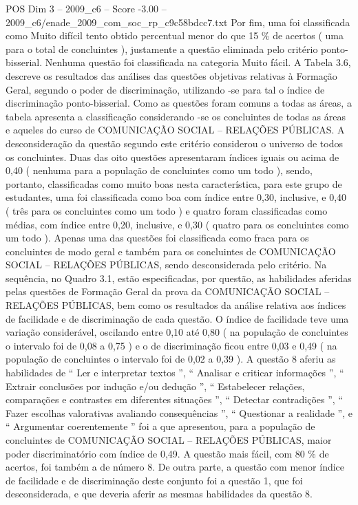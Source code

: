 \begin{textsample}{POS Dim 3 – 2009\_c6 – Score -3.00 – 2009\_c6/enade\_2009\_com\_soc\_rp\_c9c58bdcc7.txt}
Por fim, uma foi classificada como Muito difícil tento obtido percentual menor do que 15 \% de acertos ( uma para o total de concluintes ), justamente a questão eliminada pelo critério ponto-bisserial.
Nenhuma questão foi classificada na categoria Muito fácil.
A Tabela 3.6, descreve os resultados das análises das questões objetivas relativas à Formação Geral, segundo o poder de discriminação, utilizando -se para tal o índice de discriminação ponto-bisserial.
Como as questões foram comuns a todas as áreas, a tabela apresenta a classificação considerando -se os concluintes de todas as áreas e aqueles do curso de COMUNICAÇÃO SOCIAL – RELAÇÕES PÚBLICAS.
A desconsideração da questão segundo este critério considerou o universo de todos os concluintes.
Duas das oito questões apresentaram índices iguais ou acima de 0,40 ( nenhuma para a população de concluintes como um todo ), sendo, portanto, classificadas como muito boas nesta característica, para este grupo de estudantes, uma foi classificada como boa com índice entre 0,30, inclusive, e 0,40 ( três para os concluintes como um todo ) e quatro foram classificadas como médias, com índice entre 0,20, inclusive, e 0,30 ( quatro para os concluintes como um todo ).
Apenas uma das questões foi classificada como fraca para os concluintes de modo geral e também para os concluintes de COMUNICAÇÃO SOCIAL – RELAÇÕES PÚBLICAS, sendo desconsiderada pelo critério.
Na sequência, no Quadro 3.1, estão especificadas, por questão, as habilidades aferidas pelas questões de Formação Geral da prova da COMUNICAÇÃO SOCIAL – RELAÇÕES PÚBLICAS, bem como os resultados da análise relativa aos índices de facilidade e de discriminação de cada questão.
O índice de facilidade teve uma variação considerável, oscilando entre 0,10 até 0,80 ( na população de concluintes o intervalo foi de 0,08 a 0,75 ) e o de discriminação ficou entre 0,03 e 0,49 ( na população de concluintes o intervalo foi de 0,02 a 0,39 ).
A questão 8 aferiu as habilidades de “ Ler e interpretar textos ”, “ Analisar e criticar informações ”, “ Extrair conclusões por indução e/ou dedução ”, “ Estabelecer relações, comparações e contrastes em diferentes situações ”, “ Detectar contradições ”, “ Fazer escolhas valorativas avaliando consequências ”, “ Questionar a realidade ”, e “ Argumentar coerentemente ” foi a que apresentou, para a população de concluintes de COMUNICAÇÃO SOCIAL – RELAÇÕES PÚBLICAS, maior poder discriminatório com índice de 0,49.
A questão mais fácil, com 80 \% de acertos, foi também a de número 8.
De outra parte, a questão com menor índice de facilidade e de discriminação deste conjunto foi a questão 1, que foi desconsiderada, e que deveria aferir as mesmas habilidades da questão 8.

\end{textsample}
